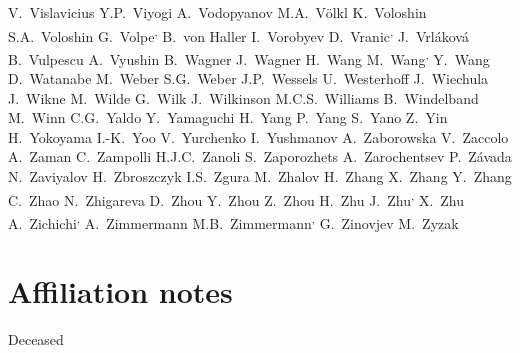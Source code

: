\begin{flushleft}
V.~Vislavicius\And
Y.P.~Viyogi\And
A.~Vodopyanov\And
M.A.~V\"{o}lkl\And
K.~Voloshin\And
S.A.~Voloshin\And
G.~Volpe\textsuperscript{,}\And
B.~von Haller\And
I.~Vorobyev\And
D.~Vranic\textsuperscript{,}\And
J.~Vrl\'{a}kov\'{a}\And
B.~Vulpescu\And
A.~Vyushin\And
B.~Wagner\And
J.~Wagner\And
H.~Wang\And
M.~Wang\textsuperscript{,}\And
Y.~Wang\And
D.~Watanabe\And
M.~Weber\And
S.G.~Weber\And
J.P.~Wessels\And
U.~Westerhoff\And
J.~Wiechula\And
J.~Wikne\And
M.~Wilde\And
G.~Wilk\And
J.~Wilkinson\And
M.C.S.~Williams\And
B.~Windelband\And
M.~Winn\And
C.G.~Yaldo\And
Y.~Yamaguchi\And
H.~Yang\And
P.~Yang\And
S.~Yano\And
Z.~Yin\And
H.~Yokoyama\And
I.-K.~Yoo\And
V.~Yurchenko\And
I.~Yushmanov\And
A.~Zaborowska\And
V.~Zaccolo\And
A.~Zaman\And
C.~Zampolli\And
H.J.C.~Zanoli\And
S.~Zaporozhets\And
A.~Zarochentsev\And
P.~Z\'{a}vada\And
N.~Zaviyalov\And
H.~Zbroszczyk\And
I.S.~Zgura\And
M.~Zhalov\And
H.~Zhang\And
X.~Zhang\And
Y.~Zhang\And
C.~Zhao\And
N.~Zhigareva\And
D.~Zhou\And
Y.~Zhou\And
Z.~Zhou\And
H.~Zhu\And
J.~Zhu\textsuperscript{,}\And
X.~Zhu\And
A.~Zichichi\textsuperscript{,}\And
A.~Zimmermann\And
M.B.~Zimmermann\textsuperscript{,}\And
G.~Zinovjev\And
M.~Zyzak
\renewcommand\labelenumi{\textsuperscript{\theenumi}~}

\section*{Affiliation notes}
\renewcommand\theenumi{\roman{enumi}}
\begin{Authlist}
\item {}Deceased
\item {}
\end{Authlist}


\end{flushleft}
